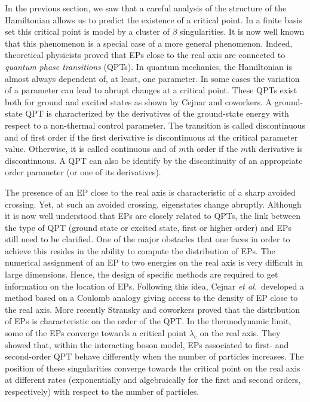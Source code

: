 \documentclass[aps,prb,reprint,noshowkeys,superscriptaddress]{revtex4-1}
\begin{document}
In the previous section, we saw that a careful analysis of the structure of the Hamiltonian allows us to predict the existence of a critical point. In a finite basis set this critical point is model by a cluster of $\beta$ singularities. It is now well known that this phenomenon is a special case of a more general phenomenon. Indeed, theoretical physicists proved that EPs close to the real axis are connected to \textit{quantum phase transitions} (QPTs). \cite{Heiss_1988,Heiss_2002,Cejnar_2005, Cejnar_2007, Cejnar_2009, Borisov_2015, Sindelka_2017} In quantum mechanics, the Hamiltonian is almost always dependent of, at least, one parameter. In some cases the variation of a parameter can lead to abrupt changes at a critical point. These QPTs exist both for ground and excited states as shown by Cejnar and coworkers. \cite{Cejnar_2009, Sachdev_2011, Cejnar_2015, Cejnar_2016, Caprio_2008, Macek_2019} A ground-state QPT is characterized by the derivatives of the ground-state energy with respect to a non-thermal control parameter. \cite{Cejnar_2009, Sachdev_2011} The transition is called discontinuous and of first order if the first derivative is discontinuous at the critical parameter value. Otherwise, it is called continuous and of $m$th order if the $m$th derivative is discontinuous. A QPT can also be identify by the discontinuity of an appropriate order parameter (or one of its derivatives). 

The presence of an EP close to the real axis is characteristic of a sharp avoided crossing. Yet, at such an avoided crossing, eigenstates change abruptly. Although it is now well understood that EPs are closely related to QPTs, the link between the type of QPT (ground state or excited state, first or higher order) and EPs still need to be clarified. One of the major obstacles that one faces in order to achieve this resides in the ability to compute the distribution of EPs. The numerical assignment of an EP to two energies on the real axis is very difficult in large dimensions. Hence, the design of specific methods are required to get information on the location of EPs. Following this idea, Cejnar \textit{et al.}~developed a method based on a Coulomb analogy giving access to the density of EP close to the real axis. \cite{Cejnar_2005, Cejnar_2007} More recently Stransky and coworkers proved that the distribution of EPs is characteristic on the order of the QPT. \cite{Stransky_2018} In the thermodynamic limit, some of the EPs converge towards a critical point $\lambda_\text{c}$ on the real axis. They showed that, within the interacting boson model, \cite{Lipkin_1965} EPs associated to first- and second-order QPT behave differently when the number of particles increases. The position of these singularities converge towards the critical point on the real axis at different rates (exponentially and algebraically for the first and second orders, respectively) with respect to the number of particles.
\end{document}
